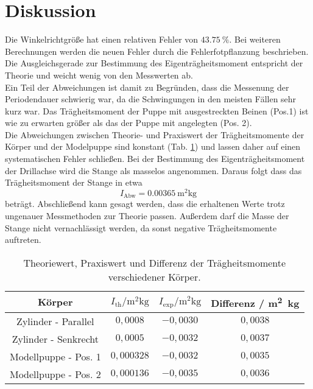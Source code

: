 \section{Diskussion}
\label{sec:Diskussion}
Die Winkelrichtgröße hat einen relativen Fehler von $\SI{43.75}{\%}$.
Bei weiteren Berechnungen werden die neuen Fehler durch die Fehlerfotpflanzung beschrieben.
Die Ausgleichsgerade zur Bestimmung des Eigenträgheitsmoment entspricht der Theorie und weicht wenig von den Messwerten ab.\\
Ein Teil der Abweichungen ist damit zu Begründen, dass die Messenung der Periodendauer schwierig war, da die Schwingungen in den meisten Fällen sehr kurz war.
Das Trägheitsmoment der Puppe mit ausgestreckten Beinen (Pos.1) ist wie zu erwarten größer als das der Puppe mit angelegten (Pos. 2).
\\
Die Abweichungen zwischen Theorie- und Praxiswert der Trägheitsmomente der Körper und der Modelpuppe sind konstant (Tab. \ref{tab:diff}) und lassen daher auf einen systematischen Fehler schließen.
Bei der Bestimmung des Eigenträgheitsmoment der Drillachse wird die Stange als masselos angenommen.
Daraus folgt dass das Trägheitsmoment der Stange in etwa
\begin{equation}
    I_\text{Abw} = \SI{0.00365}{\meter^2\kg}
\end{equation}
beträgt.
Abschließend kann gesagt werden, dass die erhaltenen Werte trotz ungenauer Messmethoden zur Theorie passen.
Außerdem darf die Masse der Stange nicht vernachlässigt werden, da sonst negative Trägheitsmomente auftreten.
\begin{table}
    \centering
    \begin{tabular}{c|ccc}
    \toprule
    Körper & $I_\text{th} / \si{\metre^2\kg}$ & $I_\text{exp} / \si{\metre^2\kg}$ & Differenz / \si{\metre^2\kg} \\
    \midrule
    Zylinder - Parallel &  $0,0008$ & $−0,0030$ & $0,0038$\\
    Zylinder - Senkrecht & $0,0005$ & $−0,0032$ & $0,0037$\\
    Modellpuppe - Pos. 1 & $0,000328$ & $−0,0032$ & $0,0035$\\
    Modellpuppe - Pos. 2 & $0,000136$ & $−0,0035$ & $0,0036$\\
    \bottomrule
    \end{tabular}
    \caption{Theoriewert, Praxiswert und Differenz der Trägheitsmomente verschiedener Körper.}
    \label{tab:diff}
\end{table}